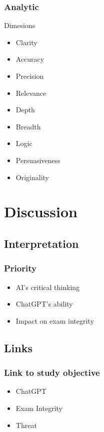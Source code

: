 \documentclass{beamer}
\begin{document}
\begin{frame}
    \frametitle{Analytic}
    \begin{block}{Dimesions}
        \LARGE
        \begin{multicols}{3}
            \begin{itemize}
                \item<1-> Clarity
                \item<1-> Accuracy
                \item<1-> Precision
                \item<2-> Relevance
                \item<2-> Depth
                \item<2-> Breadth
                \item<3-> Logic
                \item<3-> Persuasiveness
                \item<3-> Originality
            \end{itemize}
        \end{multicols}
    \end{block}
\end{frame}

\section{Discussion}

\subsection{Interpretation}
\begin{frame}
    \frametitle{Priority}
    \LARGE
    \begin{itemize}
        \item AI's critical thinking
        \item ChatGPT's ability
        \item Impact on exam integrity
    \end{itemize}
\end{frame}

\subsection{Links}
\begin{frame}
    \frametitle{Link to study objective}
    \LARGE
    \begin{itemize}
        \item ChatGPT
        \item Exam Integrity
        \item Threat
    \end{itemize}
\end{frame}
\end{document}
